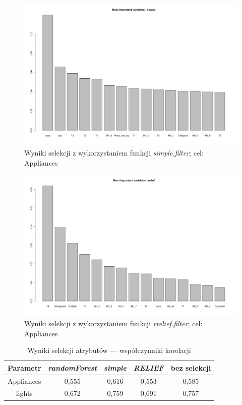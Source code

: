 \documentclass[a4paper,11pt,twoside]{mwrep}  %
\begin{document}
 \begin{figure}[!h]
    \centering \includegraphics[scale=0.4]{../simple_app.png}
    \caption{Wyniki selekcji z wykorzystaniem funkcji \textit{simple.filter}; cel: Appliances}
    \label{fig:simple_app}
\end{figure}

 \begin{figure}[!h]
    \centering \includegraphics[scale=0.4]{../relief_app.png}
    \caption{Wyniki selekcji z wykorzystaniem  funkcji \textit{rrelief.filter}; cel: Appliances}
    \label{fig:relief_app}
\end{figure}


\begin{table}[!h]  \centering
\caption{Wyniki selekcji atrybutów --- współczynniki korelacji}
\begin{tabular} { c  c  c  c  c } \hline \hline
    \textbf{Parametr} & \textbf{\textit{randomForest}} & \textbf{\textit{simple}} & \textbf{\textit{RELIEF}} & \textbf{bez selekcji}  \\ \hline
    Appliances & 0,555 & 0,616 & 0,553 & 0,585 \\
    lights & 0,672 & 0,759 & 0,691 & 0,757 \\
    \hline \hline
    
\end{tabular}
\label{table:wynikiSelekcji}
\end{table}
\end{document}
